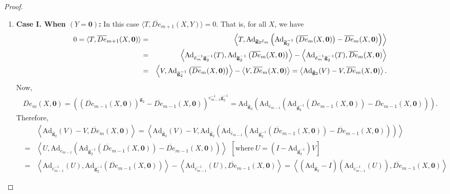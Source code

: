 \documentclass[10pt,twoside]{amsart}
\theoremstyle{definition}
\theoremstyle{definition}
\begin{document}
\begin{proof}
\begin{enumerate}
\item \textbf{Case I. When $ (Y=\mathbf{0})$:} In this case $\langle T, \overline{De}_{m+1}(X,Y)\rangle=0$.
That is, for all $X$, we have
\begin{eqnarray}{\label{eqnortho}}\nonumber
0=\langle T, \overline{De}_{m+1}(X,\mathbf{0}) \rangle &=& \left\langle T,\mathrm{Ad}_{\mathbf{\bar g}_2 \bar e_m}\left(\mathrm{Ad}_{\mathbf{\bar g}_2^{-1}}\left(\overline{De}_m(X,\mathbf{0})\right)-\overline{De}_m(X,\mathbf{0})\right)\right\rangle \\\nonumber
&=& \left\langle \mathrm{Ad}_{\bar e_m^{-1}\mathbf{\bar g}_2^{-1}}(T), \mathrm{Ad}_{\mathbf{\bar g}_2^{-1}}\left(\overline{De}_m(X,\mathbf{0})\right)\right\rangle- \left\langle \mathrm{Ad}_{\bar e_m^{-1}\mathbf{\bar g}_2^{-1}}(T), \overline{De}_m(X,\mathbf{0})\right\rangle \\
&=& \left\langle V, \mathrm{Ad}_{\mathbf{\bar g}_2^{-1}}\left(\overline{De}_m(X,\mathbf{0})\right)\right\rangle-\left\langle V,\overline{De}_m(X,\mathbf{0})\right\rangle=\left\langle \mathrm{Ad}_{\mathbf{\bar g}_2}(V)-V,\overline{De}_m(X,\mathbf{0}) \right\rangle.
\end{eqnarray} 
Now, \begin{eqnarray*}
\overline{De}_m(X,\mathbf{0}) =((\overline{De}_{m-1}(X,\mathbf{0}))^{\mathbf{g}_2}-\overline{De}_{m-1}(X,\mathbf{0}))^{e_{m-1}^{-1}\mathbf{\bar g}_2^{-1}} 
= \mathrm{Ad}_{\mathbf{\bar g}_2}\left(\mathrm{Ad}_{\bar e_{m-1}}\left(\mathrm{Ad}_{\mathbf{\bar g}_2^{-1}}\left(\overline{De}_{m-1}(X,\mathbf{0})\right)-\overline{De}_{m-1}(X,\mathbf{0})\right)\right).
 \end{eqnarray*}
Therefore,
\begin{eqnarray*}
&& \left\langle \mathrm{Ad}_{\mathbf{\bar g}_2}(V)-V,\overline{De}_m(X,\mathbf{0}) \right\rangle = \left\langle \mathrm{Ad}_{\mathbf{\bar g}_2}(V)-V,\mathrm{Ad}_{\mathbf{\bar g}_2}\left(\mathrm{Ad}_{\bar e_{m-1}}\left(\mathrm{Ad}_{\mathbf{\bar g}_2^{-1}}\left(\overline{De}_{m-1}(X,\mathbf{0})\right)-\overline{De}_{m-1}(X,\mathbf{0})\right)\right)\right\rangle \\
&=& \left\langle U,\mathrm{Ad}_{\bar e_{m-1}}\left(\mathrm{Ad}_{\mathbf{\bar g}_2^{-1}}\left(\overline{De}_{m-1}(X,\mathbf{0})\right)-\overline{De}_{m-1}(X,\mathbf{0})\right)\right\rangle \ \ [\text{where}\ U=(I-\mathrm{Ad}_{\mathbf{\bar g}_2^{-1}})V] \\
&=& \left\langle \mathrm{Ad}_{\bar e_{m-1}^{-1}}(U),\mathrm{Ad}_{\mathbf{\bar g}_2^{-1}}\left(\overline{De}_{m-1}(X,\mathbf{0})\right)\right\rangle-\left\langle \mathrm{Ad}_{\bar e_{m-1}^{-1}}(U), \overline{De}_{m-1}(X,\mathbf{0})\right\rangle = \left\langle \left(\mathrm{Ad}_{\mathbf{\bar g}_2}-I\right)\left(\mathrm{Ad}_{\bar e_{m-1}^{-1}}(U)\right), \overline{De}_{m-1}(X,\mathbf{0})\right\rangle

\end{eqnarray*}
\end{enumerate}
\end{proof}
\end{document}
